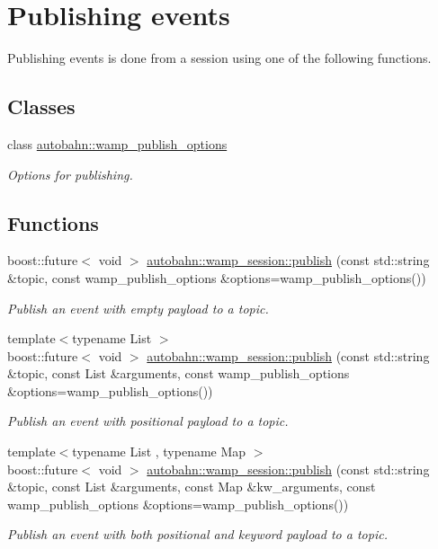 \hypertarget{group___p_u_b}{}\section{Publishing events}
\label{group___p_u_b}


Publishing events is done from a session using one of the following functions.  


\subsection*{Classes}
\begin{DoxyCompactItemize}
\item 
class \hyperlink{classautobahn_1_1wamp__publish__options}{autobahn\+::wamp\+\_\+publish\+\_\+options}
\begin{DoxyCompactList}\small\item\em Options for publishing. \end{DoxyCompactList}\end{DoxyCompactItemize}
\subsection*{Functions}
\begin{DoxyCompactItemize}
\item 
boost\+::future$<$ void $>$ \hyperlink{group___p_u_b_ga404fcf00db6996043d66a36c38fbd9e7}{autobahn\+::wamp\+\_\+session\+::publish} (const std\+::string \&topic, const wamp\+\_\+publish\+\_\+options \&options=wamp\+\_\+publish\+\_\+options())
\begin{DoxyCompactList}\small\item\em Publish an event with empty payload to a topic. \end{DoxyCompactList}\item 
{\footnotesize template$<$typename List $>$ }\\boost\+::future$<$ void $>$ \hyperlink{group___p_u_b_ga9ca2b82c99816275b2f13dff14facbb9}{autobahn\+::wamp\+\_\+session\+::publish} (const std\+::string \&topic, const List \&arguments, const wamp\+\_\+publish\+\_\+options \&options=wamp\+\_\+publish\+\_\+options())
\begin{DoxyCompactList}\small\item\em Publish an event with positional payload to a topic. \end{DoxyCompactList}\item 
{\footnotesize template$<$typename List , typename Map $>$ }\\boost\+::future$<$ void $>$ \hyperlink{group___p_u_b_ga7d40d4e66b27abc1459bdd3abc18e0bc}{autobahn\+::wamp\+\_\+session\+::publish} (const std\+::string \&topic, const List \&arguments, const Map \&kw\+\_\+arguments, const wamp\+\_\+publish\+\_\+options \&options=wamp\+\_\+publish\+\_\+options())
\begin{DoxyCompactList}\small\item\em Publish an event with both positional and keyword payload to a topic. \end{DoxyCompactList}\end{DoxyCompactItemize}


